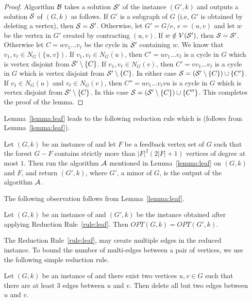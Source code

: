 \begin{proof}
Algorithm ${\cal B}$ takes a solution ${\cal S'}$ of the instance $(G',k)$ and outputs a solution ${\cal S}$ of $(G,k)$ 
as follows. If $G'$ is a subgraph of $G$ (i.e, $G'$ is obtained by deleting a vertex), then ${\cal S}={\cal S'}$. Otherwise, 
let $G'=G/e$, $e=(u,v)$ and let $w$ be the vertex in $G'$ created by contracting $(u,v)$. If $w\notin V({\cal S}')$, then 
${\cal S}={\cal S}'$. Otherwise let $C=wv_1\ldots v_{\ell}$ be the cycle in ${\cal S}'$ containing $w$. 
We know that $v_1,v_\ell \in N_G(\{u,v\})$. 
If $v_1,v_{\ell}\in N_G(u)$, then $C'=uv_1\ldots v_{\ell}$ is a cycle in $G$ which is vertex disjoint 
from ${\cal S'}\setminus \{C\}$. If $v_1,v_{\ell}\in N_G(v)$,  then $C'=vv_1\ldots v_{\ell}$ is a cycle in $G$ which is vertex disjoint 
from ${\cal S'}\setminus \{C\}$. In either case ${\cal S}=({\cal S'}\setminus \{C\})\cup \{C'\}$. 
If $v_1\in N_G(u)$ and $v_{\ell}\in N_G(v)$, then $C''=uv_1\ldots v_\ell vu$ is 
a cycle in $G$ which is vertex disjoint 
from ${\cal S'}\setminus \{C\}$. In this case ${\cal S}=({\cal S'}\setminus \{C\})\cup \{C''\}$.
This completes the proof of the lemma.
\end{proof}



Lemma~\ref{lemma:leaf} leads to the following reduction rule which is \onesafe{} (follows from Lemma~\ref{lemma:leaf}). 

\begin{redrule}
\label{rule:leaf}
 Let $(G,k)$ be an instance of \CP{} and let $F$ be a feedback vertex set of $G$ 
such that the forest $G-F$ contains strictly  
 more than $\vert F\vert^2(2\vert F\vert+1)$ vertices of degree at most $1$.  
Then run the algorithm ${\cal A}$ mentioned in Lemma~\ref{lemma:leaf} 
on $(G,k)$ and $F$, and return $(G',k)$, where $G'$, a minor of $G$, is the output of the algorithm ${\cal A}$.   
\end{redrule}


The following observation follows from Lemma~\ref{lemma:leaf}. 
\begin{observation}
\label{obs:leaf_opt}
Let $(G,k)$ be an instance of \CP{} and $(G',k)$ be the instance obtained after applying  
Reduction Rule~\ref{rule:leaf}. Then $OPT(G,k)=OPT(G',k)$. 
\end{observation}

The Reduction Rule~\ref{rule:leaf}, may create multiple edges in the reduced instance.  
To bound the number of multi-edges between a pair of vertices, we use the following 
simple reduction rule. 
\begin{redrule}
 \label{rule:multiedge}
 Let $(G,k)$ be an instance of \CP{} and there exist two vertices $u,v\in G$ such that 
 there are at least $3$ edges between $u$ and $v$. Then delete all but two edges between $u$ and 
 $v$.  
\end{redrule} 

